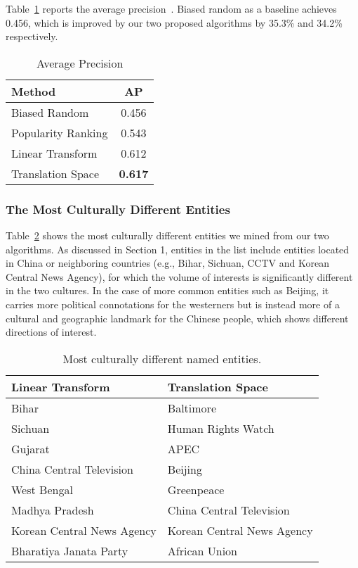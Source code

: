 Table~\ref{tbl:corr} reports the average precision~\cite{schutze2008introduction}. Biased random as a baseline achieves 0.456, which is improved by our two proposed algorithms by 35.3\% and 34.2\% respectively.



\begin{table}[th]
\small
\centering
\caption{Average Precision}
\label{tbl:corr}
\begin{tabular}{l|c}
       {\bf Method}   & {\bf AP} \\ \hline
Biased Random & 0.456 \\ \hline
Popularity Ranking & 0.543 \\ \hline
Linear Transform&  0.612 \\ \hline
Translation Space& \textbf{0.617} \\
\end{tabular}
\end{table}

\subsubsection{The Most Culturally Different Entities}

Table~\ref{tbl:list} shows the most culturally different entities we mined from
our two algorithms. As discussed in Section 1, entities in the list include
entities located in China or neighboring countries (e.g., Bihar, Sichuan,
CCTV and Korean Central News Agency), for which the volume of interests is
significantly different in the two cultures. In the case of more common
entities such as Beijing, it carries more political connotations for
the westerners but is instead more of a cultural and geographic landmark
for the Chinese people, which shows different directions of interest.

\begin{table}[th]
\small
\centering
\caption{Most culturally different named entities.}
\label{tbl:list}
\begin{tabular}{l|l}
\textbf{Linear Transform} & \textbf{Translation Space} \\ \hline
Bihar & Baltimore \\ \hline
Sichuan & Human Rights Watch \\ \hline
Gujarat & APEC \\ \hline
China Central Television & Beijing\\ \hline
West Bengal & Greenpeace \\ \hline
Madhya Pradesh & China Central Television\\ \hline
Korean Central News Agency & Korean Central News Agency\\ \hline
Bharatiya Janata Party & African Union


\end{tabular}
\end{table}


